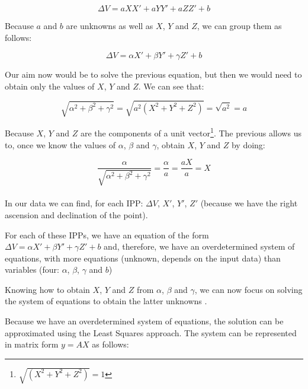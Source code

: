 \begin{equation} \label{eq:substitute}
\Delta V = aXX' + aYY' + aZZ' + b
\end{equation}

Because $a$ and $b$ are unknowns as well as $X$, $Y$ and $Z$, we can group them as follows:

\begin{equation} \label{eq:newNames}
\Delta V = \alpha X' +  \beta Y' +  \gamma Z' + b
\end{equation}

Our aim now would be to solve the previous equation, but then we would need to obtain only the values of $X$, $Y$ and $Z$. We can see that:

\begin{equation} \label{eq:elTrucoDelAlmendruco}
\sqrt{\alpha^{2}+\beta^{2}+\gamma^{2}} = \sqrt{a^{2}(X^{2}+Y^{2}+Z^{2})} = \sqrt{a^{2}} = a
\end{equation}

Because $X$, $Y$ and $Z$ are the components of a unit vector\footnote{$\sqrt{(X^{2}+Y^{2}+Z^{2})} = 1$}. The previous allows us to, once we know the values of $\alpha$, $\beta$ and $\gamma$, obtain $X$, $Y$ and $Z$ by doing:

\begin{equation} \label{eq:iso}
\frac{\alpha}{\sqrt{\alpha^{2}+\beta^{2}+\gamma^{2}}} = \frac{\alpha}{a} = \frac{aX}{a} = X
\end{equation} \\

In our data we can find, for each IPP: $\Delta V$, $X'$, $Y'$, $Z'$ (because we have the right ascension and declination of the point).

For each of these IPPs, we have an equation of the form $\Delta V = \alpha X' +  \beta Y' +  \gamma Z' + b$ and, therefore, we have an overdetermined system of equations, with more equations (unknown, depends on the input data) than variables (four: $\alpha$, $\beta$, $\gamma$ and $b$)

Knowing how to obtain $X$, $Y$ and $Z$ from $\alpha$, $\beta$ and $\gamma$, we can now focus on solving the system of equations to obtain the latter unknowns .

Because we have an overdetermined system of equations, the solution can be approximated using the Least Squares approach. The system can be represented in matrix form $y = AX$ as follows:


